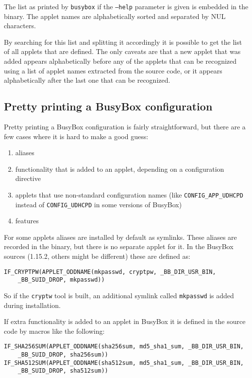 \documentclass[10pt]{article}
\begin{document}
The list as printed by \texttt{busybox} if the \texttt{--help} parameter is
given is embedded in the binary. The applet names are alphabetically sorted
and separated by NUL characters.

By searching for this list and splitting it accordingly it is possible to get
the list of all applets that are defined. The only caveats are that a new
applet that was added appears alphabetically before any of the applets that
can be recognized using a list of applet names extracted from the source code,
or it appears alphabetically after the last one that can be recognized.

\subsection{Pretty printing a BusyBox configuration}

Pretty printing a BusyBox configuration is fairly straightforward, but there
are a few cases where it is hard to make a good guess:

\begin{enumerate}
\item aliases
\item functionality that is added to an applet, depending on a configuration
directive
\item applets that use non-standard configuration names (like
\texttt{CONFIG\_APP\_UDHCPD} instead of \texttt{CONFIG\_UDHCPD} in some
versions of BusyBox)
\item features
\end{enumerate}

For some applets aliases are installed by default as symlinks. These aliases
are recorded in the binary, but there is no separate applet for it. In the
BusyBox sources (1.15.2, others might be different) these are defined as:

\begin{verbatim}
IF_CRYPTPW(APPLET_ODDNAME(mkpasswd, cryptpw, _BB_DIR_USR_BIN,
    _BB_SUID_DROP, mkpasswd))
\end{verbatim}

So if the \texttt{cryptw} tool is built, an additional symlink called
\texttt{mkpasswd} is added during installation.

If extra functionality is added to an applet in BusyBox it is defined in the
source code by macros like the following:

\begin{verbatim}
IF_SHA256SUM(APPLET_ODDNAME(sha256sum, md5_sha1_sum, _BB_DIR_USR_BIN,
    _BB_SUID_DROP, sha256sum))
IF_SHA512SUM(APPLET_ODDNAME(sha512sum, md5_sha1_sum, _BB_DIR_USR_BIN,
    _BB_SUID_DROP, sha512sum))
\end{verbatim}
\end{document}
